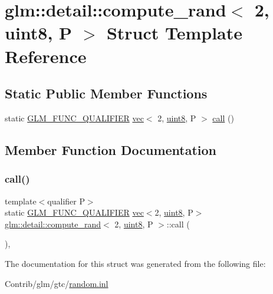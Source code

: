 \hypertarget{structglm_1_1detail_1_1compute__rand_3_012_00_01uint8_00_01_p_01_4}{}\section{glm\+:\+:detail\+:\+:compute\+\_\+rand$<$ 2, uint8, P $>$ Struct Template Reference}
\label{structglm_1_1detail_1_1compute__rand_3_012_00_01uint8_00_01_p_01_4}
\subsection*{Static Public Member Functions}
\begin{DoxyCompactItemize}
\item 
static \mbox{\hyperlink{setup_8hpp_a33fdea6f91c5f834105f7415e2a64407}{G\+L\+M\+\_\+\+F\+U\+N\+C\+\_\+\+Q\+U\+A\+L\+I\+F\+I\+ER}} \mbox{\hyperlink{structglm_1_1vec}{vec}}$<$ 2, \mbox{\hyperlink{namespaceglm_1_1detail_aef2588f97d090cc19fbbe0c74fe17c8f}{uint8}}, P $>$ \mbox{\hyperlink{structglm_1_1detail_1_1compute__rand_3_012_00_01uint8_00_01_p_01_4_a4fb277fdbfbcf3fa064f1694a9a9ac1a}{call}} ()
\end{DoxyCompactItemize}


\subsection{Member Function Documentation}
\mbox{\label{structglm_1_1detail_1_1compute__rand_3_012_00_01uint8_00_01_p_01_4_a4fb277fdbfbcf3fa064f1694a9a9ac1a}} 
\subsubsection{\texorpdfstring{call()}{call()}}
{\footnotesize\ttfamily template$<$qualifier P$>$ \\
static \mbox{\hyperlink{setup_8hpp_a33fdea6f91c5f834105f7415e2a64407}{G\+L\+M\+\_\+\+F\+U\+N\+C\+\_\+\+Q\+U\+A\+L\+I\+F\+I\+ER}} \mbox{\hyperlink{structglm_1_1vec}{vec}}$<$2, \mbox{\hyperlink{namespaceglm_1_1detail_aef2588f97d090cc19fbbe0c74fe17c8f}{uint8}}, P$>$ \mbox{\hyperlink{structglm_1_1detail_1_1compute__rand}{glm\+::detail\+::compute\+\_\+rand}}$<$ 2, \mbox{\hyperlink{namespaceglm_1_1detail_aef2588f97d090cc19fbbe0c74fe17c8f}{uint8}}, P $>$\+::call (\begin{DoxyParamCaption}{ }\end{DoxyParamCaption})\hspace{0.3cm}{\ttfamily [inline]}, {\ttfamily [static]}}



The documentation for this struct was generated from the following file\+:\begin{DoxyCompactItemize}
\item 
Contrib/glm/gtc/\mbox{\hyperlink{random_8inl}{random.\+inl}}\end{DoxyCompactItemize}
